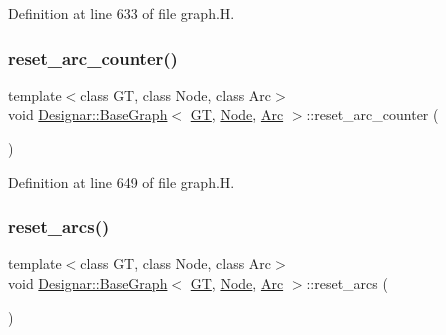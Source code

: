 Definition at line 633 of file graph.\+H.

\mbox{\label{class_designar_1_1_base_graph_a8b22e29aa37006fab9c219de86660bdd}} 
\subsubsection{\texorpdfstring{reset\+\_\+arc\+\_\+counter()}{reset\_arc\_counter()}}
{\footnotesize\ttfamily template$<$class GT, class Node, class Arc$>$ \\
void \hyperlink{class_designar_1_1_base_graph}{Designar\+::\+Base\+Graph}$<$ \hyperlink{demo-buildgraph_8_c_a3001c40d2c31ca87ed96cd7d1334a55e}{GT}, \hyperlink{namespace_designar_a5af326c65aa2bd26b26c410f2030d09e}{Node}, \hyperlink{namespace_designar_a3f55fb5513d62ff47cbc8f72b8e95d6f}{Arc} $>$\+::reset\+\_\+arc\+\_\+counter (\begin{DoxyParamCaption}{ }\end{DoxyParamCaption})\hspace{0.3cm}{\ttfamily [inline]}}



Definition at line 649 of file graph.\+H.

\mbox{\label{class_designar_1_1_base_graph_a6dc66191c2d752bf7f67a4522a7830e3}} 
\subsubsection{\texorpdfstring{reset\+\_\+arcs()}{reset\_arcs()}}
{\footnotesize\ttfamily template$<$class GT, class Node, class Arc$>$ \\
void \hyperlink{class_designar_1_1_base_graph}{Designar\+::\+Base\+Graph}$<$ \hyperlink{demo-buildgraph_8_c_a3001c40d2c31ca87ed96cd7d1334a55e}{GT}, \hyperlink{namespace_designar_a5af326c65aa2bd26b26c410f2030d09e}{Node}, \hyperlink{namespace_designar_a3f55fb5513d62ff47cbc8f72b8e95d6f}{Arc} $>$\+::reset\+\_\+arcs (\begin{DoxyParamCaption}{ }\end{DoxyParamCaption})\hspace{0.3cm}{\ttfamily [inline]}}



